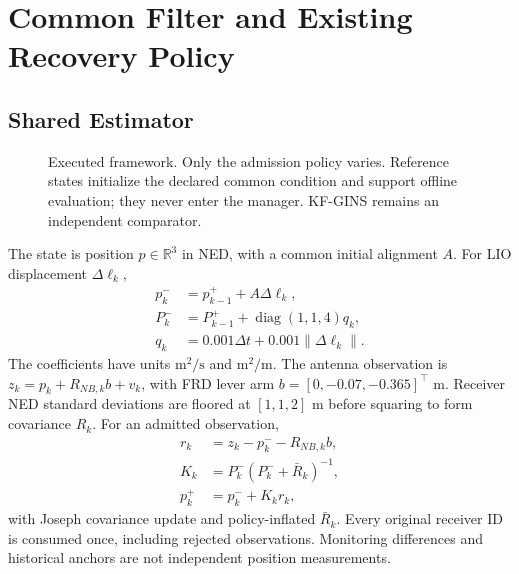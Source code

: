 \documentclass[conference]{IEEEtran}
\begin{document}
\section{Common Filter and Existing Recovery Policy}
\subsection{Shared Estimator}
\begin{figure}[t]
\centering
{}
\caption{Executed framework. Only the admission policy varies. Reference states initialize the declared common condition and support offline evaluation; they never enter the manager. KF-GINS remains an independent comparator.}
\label{fig:framework}
\end{figure}
The state is position $p\in\mathbb{R}^{3}$ in NED, with a common initial alignment $A$. For LIO displacement $\Delta\ell_k$,
\begin{align}
 p_k^-&=p_{k-1}^++A\Delta\ell_k,\\
 P_k^-&=P_{k-1}^++\operatorname{diag}(1,1,4)q_k,\\
 q_k&=0.001\Delta t+0.001\|\Delta\ell_k\|.
\end{align}
The coefficients have units $\mathrm{m^2/s}$ and $\mathrm{m^2/m}$. The antenna observation is $z_k=p_k+R_{NB,k}b+v_k$, with FRD lever arm $b=[0,-0.07,-0.365]^\top$ m. Receiver NED standard deviations are floored at $[1,1,2]$ m before squaring to form covariance $R_k$. For an admitted observation,
\begin{align}
 r_k&=z_k-p_k^--R_{NB,k}b,\\
 K_k&=P_k^-(P_k^-+\bar R_k)^{-1},\\
 p_k^+&=p_k^-+K_kr_k,
\end{align}
with Joseph covariance update and policy-inflated $\bar R_k$. Every original receiver ID is consumed once, including rejected observations. Monitoring differences and historical anchors are not independent position measurements.
\end{document}
